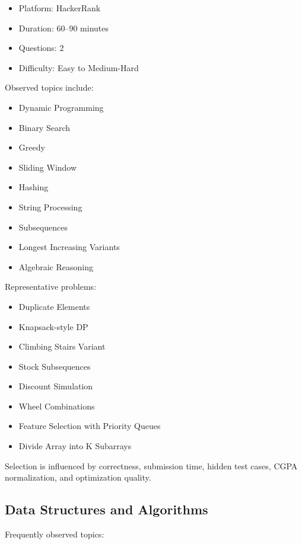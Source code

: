\documentclass[11pt,a4paper]{article}
\begin{document}
\begin{itemize}
	\item Platform: HackerRank
	\item Duration: 60--90 minutes
	\item Questions: 2
	\item Difficulty: Easy to Medium-Hard
\end{itemize}

Observed topics include:

\begin{itemize}
	\item Dynamic Programming
	\item Binary Search
	\item Greedy
	\item Sliding Window
	\item Hashing
	\item String Processing
	\item Subsequences
	\item Longest Increasing Variants
	\item Algebraic Reasoning
\end{itemize}

Representative problems:

\begin{itemize}
	\item Duplicate Elements
	\item Knapsack-style DP
	\item Climbing Stairs Variant
	\item Stock Subsequences
	\item Discount Simulation
	\item Wheel Combinations
	\item Feature Selection with Priority Queues
	\item Divide Array into K Subarrays
\end{itemize}

Selection is influenced by correctness, submission time, hidden test cases, CGPA normalization, and optimization quality.


\subsection{Data Structures and Algorithms}

Frequently observed topics:
\end{document}
